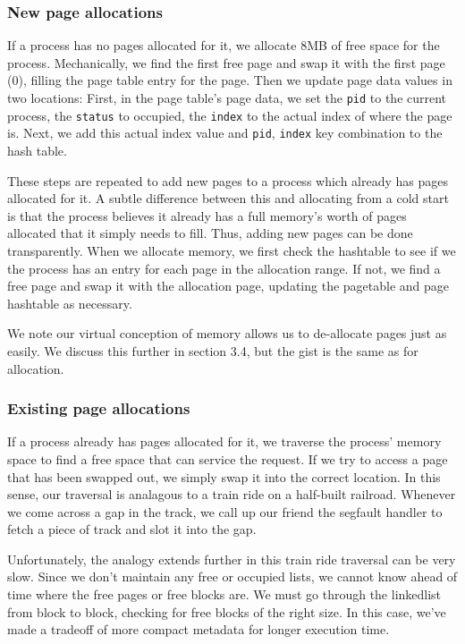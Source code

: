 \documentclass{article}
\begin{document}
\subsubsection{New page allocations}
If a process has no pages allocated for it, we  allocate 8MB of free space for the process. Mechanically, we find the first free page and swap it with the first page (0), filling the page table entry for the page. Then we update page data values in two locations: First, in the page table's page data, we set the \texttt{pid} to the current process, the \texttt{status} to occupied, the \texttt{index} to the actual index of where the page is. Next, we add this actual index value and \texttt{pid}, \texttt{index} key combination to the hash table.

These steps are repeated to add new pages to a process which already has pages allocated for it. A subtle difference between this and allocating from a cold start is that the process believes it already has a full memory's worth of pages allocated that it simply needs to fill. Thus, adding new pages can be done transparently. When we allocate memory, we first check the hashtable to see if we the process has an entry for each page in the allocation range. If not, we find a free page and swap it with the allocation page, updating the pagetable and page hashtable as necessary.

We note our virtual conception of memory allows us to de-allocate pages just as easily. We discuss this further in section 3.4, but the gist is the same as for allocation.

\subsubsection{Existing page allocations}
If a process already has pages allocated for it, we traverse the process' memory space to find a free space that can service the request. If we try to access a page that has been swapped out, we simply swap it into the correct location. In this sense, our traversal is analagous to a train ride on a half-built railroad. Whenever we come across a gap in the track, we call up our friend the segfault handler to fetch a piece of track and slot it into the gap.

Unfortunately, the analogy extends further in this train ride traversal can be very slow. Since we don't maintain any free or occupied lists, we cannot know ahead of time where the free pages or free blocks are. We must go through the linkedlist from block to block, checking for free blocks of the right size. In this case, we've made a tradeoff of more compact metadata for longer execution time.
\end{document}
